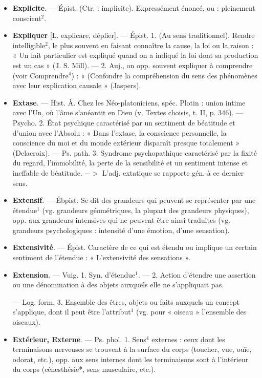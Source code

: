 \begin{itemize}[leftmargin=1cm, label=, itemsep=1pt]
\item {\bf Explicite}. — Épist. (Ctr. : implicite).
Expressément énoncé, ou : pleinement conscient$^2$.

\item {\bf Expliquer} [L. explicare, déplier]. —
Épist. 1. (Au sens traditionnel).
Rendre intelligible$^2$, le plus souvent
en faisant connaître la cause, la loi
ou la raison : « Un fait particulier est
expliqué quand on a indiqué la loi
dont sa production est un cas »
(J. S. Mill). — 2. Auj., on opp. souvent expliquer à comprendre (voir
Comprendre$^4$) : « (Confondre la
compréhension du sens des phénomènes avec leur explication causale »
(Jaspers).

\item {\bf Extase}. — Hist. À. Chez les Néo-platoniciens, spéc. Plotin : union intime
avec l’Un, où l'âme s'anéantit en
Dieu (v. Textes choisis, t. II, p. 346).
— Psycho. 2. État psychique caractérisé par un sentiment de béatitude
et d'union avec l’Absolu : « Dans
l'extase, la conscience personnelle,
la conscience du moi et du monde
extérieur disparaît presque totalement » (Delacroix). — Ps. path.
3. Syndrome psychopathique caractérisé par la fixité du regard, l’immobilité, la perte de la sensibilité
et un sentiment intense et ineffable
de béatitude. $->$ L'adj. extatique
se rapporte gén. à ce dernier sens.

\item {\bf Extensif}. — Ébpist. Se dit des grandeurs qui peuvent se représenter par
une étendue$^1$ (vg. grandeurs géométriques, la plupart des grandeurs
physiques), opp. aux grandeurs
intensives qui ne peuvent être ainsi
traduites (vg. grandeurs psychologiques : intensité d'une émotion,
d’une sensation).

\item {\bf Extensivité}. — Épist. Caractère de ce
qui est étendu ou implique un certain
sentiment de l'étendue : « L’extensivité des sensations ».

\item {\bf Extension}. — Vuig. 1. Syn. d’étendue$^1$.
— 2, Action d'étendre une assertion ou une dénomination à des
objets auxquels elle ne s’appliquait
pas.

— Log. form. 3. Ensemble des
êtres, objets ou faits auxquels un
concept s’applique, dont il peut être
l’attribut$^1$ (vg. pour « oiseau »
l’ensemble des oiseaux).

\item {\bf Extérieur, Externe}. — Ps. phol. 1.
Sens$^4$ externes : ceux dont les terminaisons nerveuses se trouvent à
la surface du corps (toucher, vue,
ouïe, odorat, etc.), opp. aux sens
internes dont les terminaisons sont
à l'intérieur du corps (cénesthésie*,
sens musculaire, etc.).


\end{itemize}
